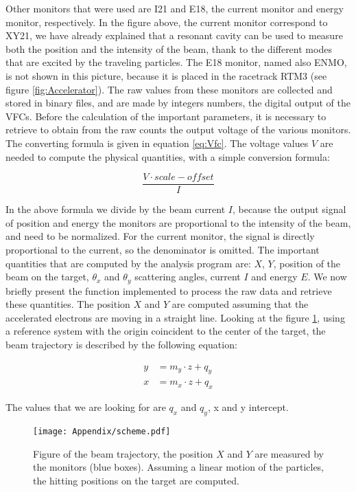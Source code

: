 \begin{appendices}
Other monitors that were used are I21 and E18, the current monitor and energy monitor, respectively. In the figure above, the current monitor correspond to XY21, we have already explained that a resonant cavity can be used to measure both the position and the intensity of the beam, thank to the different modes that are excited by the traveling particles. The E18 monitor, named also ENMO, is not shown in this picture, because it is placed in the racetrack RTM3 (see figure \ref{fig:Accelerator}). 
The raw values from these monitors are collected and stored in binary files, and are made by integers numbers, the digital output of the VFCs. Before the calculation of the important parameters, it is necessary to retrieve to obtain from the raw counts the output voltage of the various monitors. The converting formula is given in equation \ref{eq:Vfc}. The voltage values $V$ are needed to compute the physical quantities, with a simple conversion formula:

\begin{equation}
\dfrac{V \cdot scale - offset}{I}
\end{equation}

In the above formula we divide by the beam current $I$, because the output signal of position and energy the monitors are proportional to the intensity of the beam, and need to be normalized. For the current monitor, the signal is directly proportional to the current, so the denominator is omitted.
The important quantities that are computed by the analysis program are: $X$, $Y$, position of the beam on the target, $\theta_{x}$ and $\theta_{y}$ scattering angles, current $I$ and energy $E$. 
We now briefly present the function implemented to process the raw data and retrieve these quantities. \medskip
The position $X$ and $Y$ are computed assuming that the accelerated electrons are moving in a straight line. Looking at the figure \ref{fig:BeamTraje}, using a reference system with the origin coincident to the center of the target, the beam trajectory is described by the following equation:

\begin{align*}
y &= m_{y} \cdot z + q_{y} \\
x &= m_{x} \cdot z + q_{x}
\end{align*}

The values that we are looking for are $q_{x}$ and $q_{y}$, x and y intercept. 

\begin{figure}[hbtp]
\centering
\texttt{[image: Appendix/scheme.pdf]}
\caption{Figure of the beam trajectory, the position $X$ and $Y$ are measured by the monitors (blue boxes). Assuming a linear motion of the particles, the hitting positions on the target are computed.}
\label{fig:BeamTraje}
\end{figure}


\end{appendices}
